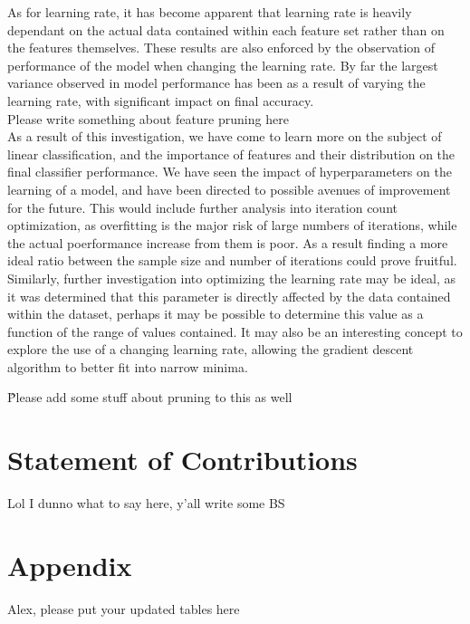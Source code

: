 As for learning rate, it has become apparent that learning rate is heavily dependant on the actual data contained within each feature set rather than on the features themselves. These results are also enforced by the observation of performance of the model when changing the learning rate. By far the largest variance observed in model performance has been as a result of varying the learning rate, with significant impact on final accuracy.\\

Please write something about feature pruning here\\

As a result of this investigation, we have come to learn more on the subject of linear classification, and the importance of features and their distribution on the final classifier performance. We have seen the impact of hyperparameters on the learning of a model, and have been directed to possible avenues of improvement for the future. This would include further analysis into iteration count optimization, as overfitting is the major risk of large numbers of iterations, while the actual poerformance increase from them is poor. As a result finding a more ideal ratio between the sample size and number of iterations could prove fruitful. Similarly, further investigation into optimizing the learning rate may be ideal, as it was determined that this parameter is directly affected by the data contained within the dataset, perhaps it may be possible to determine this value as a function of the range of values contained. It may also be an interesting concept to explore the use of a changing learning rate, allowing the gradient descent algorithm to better fit into narrow minima.

\^ Please add some stuff about pruning to this as well

\section{Statement of Contributions}

Lol I dunno what to say here, y'all write some BS

\section{Appendix}

Alex, please put your updated tables here 


